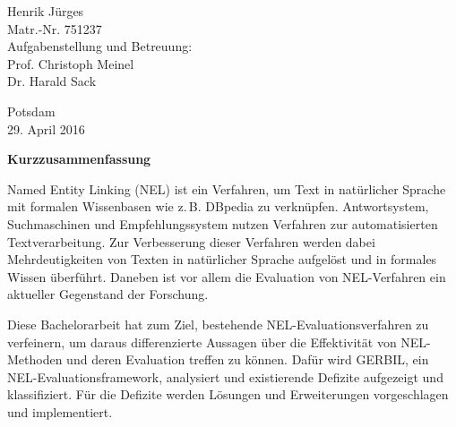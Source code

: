 \documentclass[11pt, a4paper]{article}
\begin{document}
\begin{titlepage}
\begin{center}
    \vspace{1em}
    
		{\Large Henrik Jürges} \\
        {Matr.-Nr. 751237}\\

    \vspace{2em}
        {Aufgabenstellung und Betreuung:}\\
        {Prof. Christoph Meinel}\\
        {Dr. Harald Sack}
		
    \vspace{3em}    
    Potsdam\\
    29. April 2016
  \end{center}
\end{titlepage}


\begin{center}
{\bf Kurzzusammenfassung}
\end{center}
\noindent
Named Entity Linking (NEL) ist ein Verfahren, um Text in natürlicher Sprache mit formalen Wissenbasen wie z.\,B. DBpedia 
zu verknüpfen. Antwortsystem, Suchmaschinen und Empfehlungssystem nutzen Verfahren zur automatisierten Textverarbeitung.
Zur Verbesserung dieser Verfahren werden dabei Mehrdeutigkeiten von Texten in natürlicher Sprache aufgelöst und in formales
Wissen überführt.
Daneben ist vor allem die Evaluation von NEL-Verfahren ein aktueller Gegenstand der Forschung.

Diese Bachelorarbeit hat zum Ziel, bestehende NEL-Evaluationsverfahren zu verfeinern, um daraus differenzierte Aussagen über
die Effektivität von NEL-Methoden und deren Evaluation treffen zu können. Dafür wird GERBIL, ein NEL-Evaluationsframework, analysiert und
existierende Defizite aufgezeigt und klassifiziert. Für die Defizite werden Lösungen und Erweiterungen vorgeschlagen und implementiert.

\newpage

\tableofcontents 
\newpage

\newpage
\begin{appendix}


\listoffigures

\newpage
{}
\listoftables
\end{appendix}
\newpage
\end{document}
